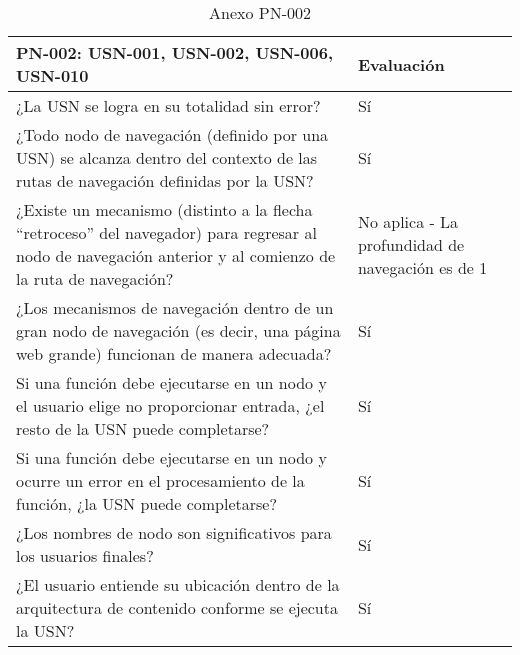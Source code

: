 \begin{table}[htpb]
\centering
\begin{tabularx}{\textwidth}{|X|X|}
\hline
\rowcolor[gray]{0.9}\textbf{PN-002: USN-001, USN-002, USN-006, USN-010}                                                                                                         & \textbf{Evaluación}                              \\ \hline
¿La USN se logra en su totalidad sin error?                                                                                                                & Sí                                               \\ \hline
¿Todo nodo de navegación (definido por una USN) se alcanza dentro del contexto de las rutas de navegación definidas por la USN?                            & Sí                                               \\ \hline
¿Existe un mecanismo (distinto a la flecha ``retroceso'' del navegador) para regresar al nodo de navegación anterior y al comienzo de la ruta de navegación? & No aplica - La profundidad de navegación es de 1 \\ \hline
¿Los mecanismos de navegación dentro de un gran nodo de navegación (es decir, una página web grande) funcionan de manera adecuada?                         & Sí                                               \\ \hline
Si una función debe ejecutarse en un nodo y el usuario elige no proporcionar entrada, ¿el resto de la USN puede completarse?                               & Sí                                               \\ \hline
Si una función debe ejecutarse en un nodo y ocurre un error en el procesamiento de la función, ¿la USN puede completarse?                                  & Sí                                               \\ \hline
¿Los nombres de nodo son significativos para los usuarios finales?                                                                                         & Sí                                               \\ \hline
¿El usuario entiende su ubicación dentro de la arquitectura de contenido conforme se ejecuta la USN?                                                       & Sí                                               \\ \hline
\end{tabularx}
\caption{Anexo PN-002}
\end{table}


